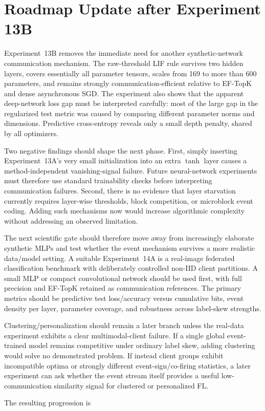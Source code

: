 \section{Roadmap Update after Experiment 13B}
\label{sec:roadmap-post-13b}

Experiment~13B removes the immediate need for another synthetic-network communication mechanism. The raw-threshold LIF rule survives two hidden layers, covers essentially all parameter tensors, scales from 169 to more than 600 parameters, and remains strongly communication-efficient relative to EF-TopK and dense asynchronous SGD. The experiment also shows that the apparent deep-network loss gap must be interpreted carefully: most of the large gap in the regularized test metric was caused by comparing different parameter norms and dimensions. Predictive cross-entropy reveals only a small depth penalty, shared by all optimizers.

Two negative findings should shape the next phase. First, simply inserting Experiment~13A's very small initialization into an extra $\tanh$ layer causes a method-independent vanishing-signal failure. Future neural-network experiments must therefore use standard trainability checks before interpreting communication failures. Second, there is no evidence that layer starvation currently requires layer-wise thresholds, block competition, or microblock event coding. Adding such mechanisms now would increase algorithmic complexity without addressing an observed limitation.

The next scientific gate should therefore move away from increasingly elaborate synthetic MLPs and test whether the event mechanism survives a more realistic data/model setting. A suitable Experiment~14A is a real-image federated classification benchmark with deliberately controlled non-IID client partitions. A small MLP or compact convolutional network should be used first, with full precision and EF-TopK retained as communication references. The primary metrics should be predictive test loss/accuracy versus cumulative bits, event density per layer, parameter coverage, and robustness across label-skew strengths.

Clustering/personalization should remain a later branch unless the real-data experiment exhibits a clear multimodal-client failure. If a single global event-trained model remains competitive under ordinary label skew, adding clustering would solve no demonstrated problem. If instead client groups exhibit incompatible optima or strongly different event-sign/co-firing statistics, a later experiment can ask whether the event stream itself provides a useful low-communication similarity signal for clustered or personalized FL.

The resulting progression is
\begin{center}
\end{center}
